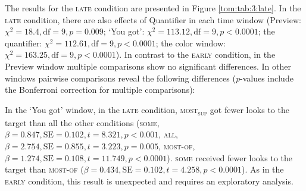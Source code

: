 \documentclass[output=paper]{langscibook}
\begin{document}
The results for the \textsc{late} condition are presented in Figure \ref{tom:tab:3:late}. In the \textsc{late} condition, there are also effects of Quantifier in each time window (Preview: $\chi^2=18.4, \text{df}=9, p=0.009$; `You got': $\chi^2=113.12, \text{df}=9,
p<0.0001$; the quantifier: $\chi^2=112.61, \text{df}=9, p<0.0001$; the color window:
$\chi^2=163.25, \text{df}=9, p<0.0001$). In contrast to the \textsc{early} condition, in the Preview window multiple
comparisons show no significant differences. In other windows pairwise comparisons reveal the following differences
(\textit{p}{}-values include the Bonferroni correction for multiple comparisons):

In the `You got' window, in the \textsc{late} condition, \textsc{most\textsubscript{sup}} got fewer looks to the target than all
the other conditions (\textsc{some}, $\beta =0.847, \text{SE}=0.102, t=8.321, p<0.001$,
\textsc{all}, $\beta =2.754, \text{SE}=0.855, t=3.223, p=0.005$, \textsc{most-of}, $\beta =1.274, \text{SE}=0.108,
t=11.749, p<0.0001$). \textsc{some} received fewer looks to the target than \textsc{most-of} ($\beta
=0.434, \text{SE}=0.102, t=4.258, p<0.0001$). As in the \textsc{early} condition, this result is unexpected
and requires an exploratory analysis. 

\end{document}
